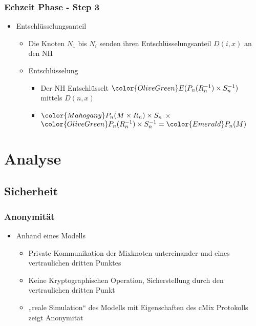 \documentclass[t, xcolor=dvipsnames]{beamer}
\begin{document}
\begin{frame}
	\frametitle{Echzeit Phase - Step 3}
	\begin{itemize}
		\item Entschlüsselungsanteil
			\begin{itemize}
				\item Die Knoten $N_1$ bis $N_{i}$ senden ihren Entschlüsselungsanteil $D(i,x)$ an den NH
				
		\item Entschlüsselung
		\begin{itemize}
				\item Der NH Entschlüsselt $\color{OliveGreen} E(P_n(R_n^{-1}) \times S_n^{-1})$ mittels $D(n,x)$
				\item $\color{Mahogany}P_n(M \times R_n) \times S_n$ $\times$ $\color{OliveGreen}P_n(R_n^{-1}) \times S_n^{-1} = \color{Emerald} P_n(M)$
			\end{itemize}
		\end{itemize}
	\end{itemize}
	\vspace{\fill}
\end{frame}


\section{Analyse}
\subsection{Sicherheit}
\begin{frame}
	\frametitle{Anonymität}
	\begin{itemize}
		\item Anhand eines Modells
			\begin{itemize}
				\item Private Kommunikation der Mixknoten untereinander und eines vertraulichen dritten Punktes
				\item Keine Kryptographischen Operation, Sicherstellung durch den vertraulichen dritten Punkt
				\item „reale Simulation“ des Modells mit Eigenschaften des cMix Protokolls zeigt Anonymität
			\end{itemize}
	\end{itemize}
	\vspace{\fill}
\end{frame}
\end{document}

